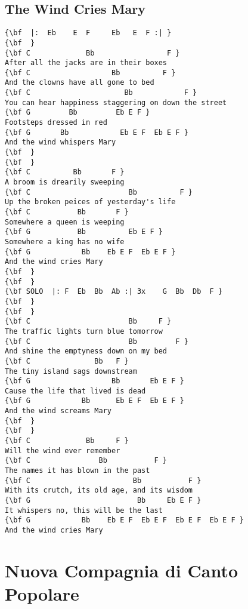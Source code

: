 \documentclass[a4paper]{article}
\begin{document}
\subsection{The Wind Cries Mary}
\begin{Verbatim}[commandchars=\\\{\}]
{\bf  |:  Eb    E  F     Eb   E  F :| }
{\bf  }
{\bf C             Bb                 F }
After all the jacks are in their boxes 
{\bf C                   Bb          F }
And the clowns have all gone to bed 
{\bf C                      Bb            F }
You can hear happiness staggering on down the street 
{\bf G         Bb         Eb E F }
Footsteps dressed in red 
{\bf G       Bb            Eb E F  Eb E F }
And the wind whispers Mary 
{\bf  }
{\bf  }
{\bf C          Bb       F }
A broom is drearily sweeping 
{\bf C                       Bb          F }
Up the broken peices of yesterday's life 
{\bf C           Bb       F }
Somewhere a queen is weeping 
{\bf G           Bb          Eb E F }
Somewhere a king has no wife 
{\bf G            Bb    Eb E F  Eb E F }
And the wind cries Mary 
{\bf  }
{\bf  }
{\bf SOLO  |: F  Eb  Bb  Ab :| 3x    G  Bb  Db  F }
{\bf  }
{\bf  }
{\bf C                       Bb     F }
The traffic lights turn blue tomorrow 
{\bf C                       Bb         F }
And shine the emptyness down on my bed 
{\bf C               Bb   F }
The tiny island sags downstream 
{\bf G                   Bb       Eb E F }
Cause the life that lived is dead 
{\bf G            Bb      Eb E F  Eb E F }
And the wind screams Mary 
{\bf  }
{\bf  }
{\bf C             Bb     F }
Will the wind ever remember 
{\bf C                Bb           F }
The names it has blown in the past 
{\bf C                        Bb           F }
With its crutch, its old age, and its wisdom 
{\bf G                         Bb     Eb E F }
It whispers no, this will be the last 
{\bf G            Bb    Eb E F  Eb E F  Eb E F  Eb E F }
And the wind cries Mary 

\end{Verbatim}
\newpage
\section{Nuova Compagnia di Canto Popolare}
\end{document}

